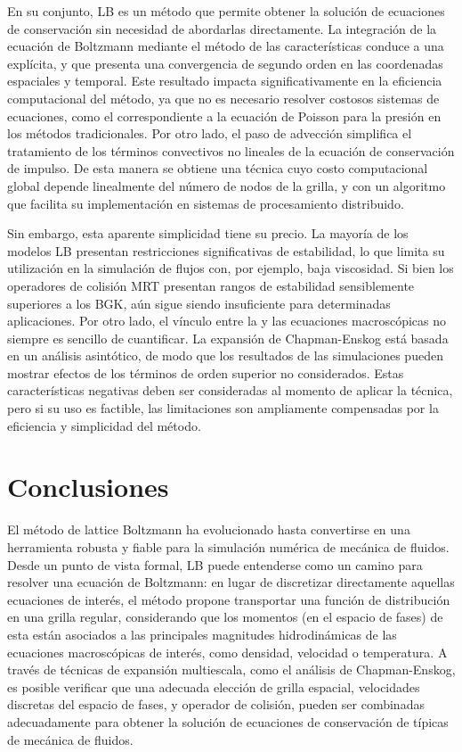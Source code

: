 En su conjunto, LB es un m\'etodo que permite obtener la soluci\'on de ecuaciones de conservaci\'on sin necesidad de abordarlas directamente. La integraci\'on de la ecuaci\'on de Boltzmann mediante el m\'etodo de las caracter\'isticas conduce a una \lbe{} expl\'icita, y que presenta una convergencia de segundo orden en las coordenadas espaciales y temporal. Este resultado impacta significativamente en la eficiencia computacional del m\'etodo, ya que no es necesario resolver costosos sistemas de ecuaciones, como el correspondiente a la ecuaci\'on de Poisson para la presi\'on en los m\'etodos tradicionales. Por otro lado, el paso de advecci\'on simplifica el tratamiento de los t\'erminos convectivos no lineales de la ecuaci\'on de conservaci\'on de impulso. De esta manera se obtiene una t\'ecnica cuyo costo computacional global depende linealmente del n\'umero de nodos de la grilla, y con un algoritmo que facilita su implementaci\'on en sistemas de procesamiento distribuido. 

Sin embargo, esta aparente simplicidad tiene su precio. La mayor\'ia de los modelos LB presentan restricciones significativas de estabilidad, lo que limita su utilizaci\'on en la simulaci\'on de flujos con, por ejemplo, baja viscosidad. Si bien los operadores de colisi\'on MRT presentan rangos de estabilidad sensiblemente superiores a los BGK, a\'un sigue siendo insuficiente para determinadas aplicaciones. Por otro lado, el v\'inculo entre la \lbe{} y las ecuaciones macrosc\'opicas no siempre es sencillo de cuantificar. La expansi\'on de Chapman-Enskog est\'a basada en un an\'alisis asint\'otico, de modo que los resultados de las simulaciones pueden mostrar efectos de los t\'erminos de orden superior no considerados. Estas caracter\'isticas negativas deben ser consideradas al momento de aplicar la t\'ecnica, pero si su uso es factible, las limitaciones son ampliamente compensadas por la eficiencia y simplicidad del m\'etodo.


\section{Conclusiones}

El m\'etodo de lattice Boltzmann ha evolucionado hasta convertirse en una herramienta robusta y fiable para la simulaci\'on num\'erica de mec\'anica de fluidos. Desde un punto de vista formal, LB puede entenderse como un camino para resolver una ecuaci\'on de Boltzmann: en lugar de discretizar directamente aquellas ecuaciones de inter\'es, el m\'etodo propone transportar una funci\'on de distribuci\'on en una grilla regular, considerando que los momentos (en el espacio de fases) de esta \fdp{} est\'an asociados a las principales magnitudes hidrodin\'amicas de las ecuaciones macrosc\'opicas de inter\'es, como densidad, velocidad o temperatura. A trav\'es de t\'ecnicas de expansi\'on multiescala, como el an\'alisis de Chapman-Enskog, es posible verificar que una adecuada elecci\'on de grilla espacial, velocidades discretas del espacio de fases, y operador de colisi\'on, pueden ser combinadas adecuadamente para obtener la soluci\'on de ecuaciones de conservaci\'on de t\'ipicas de mec\'anica de fluidos. 